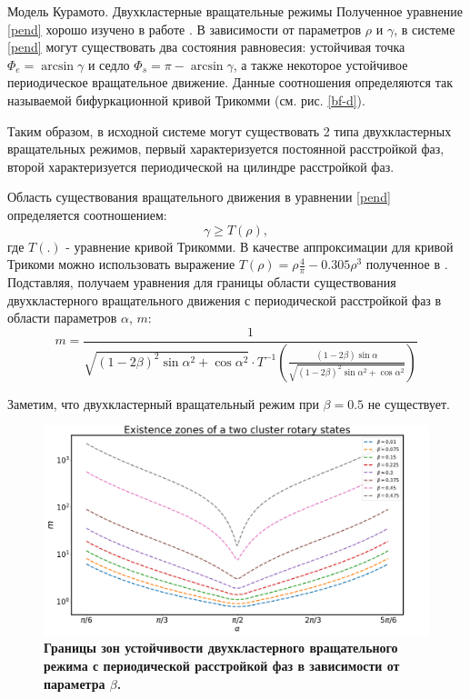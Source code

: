 \begin{chapter}{Модель Курамото. Двухкластерные вращательные режимы}
	Полученное уравнение \ref{pend} хорошо изучено в работе \cite{Andronov:Vitt}.
	В зависимости от параметров $\rho$ и $\gamma$, в системе \ref{pend}
	могут существовать два состояния равновесия:
	устойчивая точка $\Phi_e = \arcsin{\gamma}$ и седло
	$\Phi_s = \pi - \arcsin{\gamma}$, а также
	некоторое устойчивое периодическое вращательное движение.
	Данные соотношения определяются так называемой
	бифуркационной кривой Трикомми (см. рис. \ref{bf-d}).

	Таким образом, в исходной системе могут существовать 2 типа
	двухкластерных вращательных режимов, первый характеризуется
	постоянной расстройкой фаз, второй характеризуется
    периодической на цилиндре расстройкой фаз.

	Область существования вращательного движения в уравнении \ref{pend}
	определяется соотношением:
	\begin{equation}
		\gamma \ge T(\rho),
	\end{equation}
	где $T(.)$ - уравнение кривой Трикомми. В качестве аппроксимации для кривой Трикоми можно использовать выражение
	$T(\rho) = \rho\frac{4}{\pi} - 0.305\rho^3$ полученное в \cite{Belykh:Brister}.
	Подставляя, получаем уравнения для границы области существования двухкластерного вращательного движения с
	периодической расстройкой фаз в области параметров $\alpha$, $m$:
	\begin{equation} \label{borders}
		m = \frac{1}{\sqrt{(1 - 2\beta)^2\sin{\alpha}^2 + \cos{\alpha}^2} \cdot T^{-1}(\frac{(1 - 2\beta)\sin{\alpha}}{\sqrt{(1 - 2\beta)^2\sin{\alpha}^2 + \cos{\alpha}^2}})}
	\end{equation}

	Заметим, что двухкластерный вращательный режим при $\beta = 0.5$ не существует.

	\begin{figure}[h!]
		\begin{center}
			\includegraphics[width=1\columnwidth]{pictures/ex.png}
		\end{center}
		\caption{\textbf{Границы зон устойчивости двухкластерного вращательного режима с периодической расстройкой фаз в зависимости от параметра $\beta$.}}
		\label{ex-zones}
	\end{figure}


\end{chapter}
